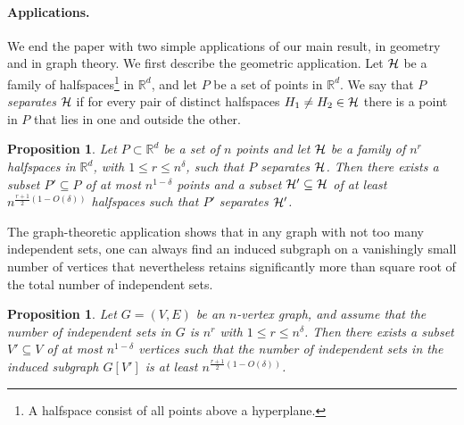 \documentclass[11pt]{article}
\newtheorem{prop}[theo]{Proposition}
\newcommand{\R}{{\mathbb R}}
\renewcommand{\d}{\delta}
\newcommand{\HH}{{\cal H}}
\begin{document}
\paragraph{Applications.}
We end the paper with two simple 
applications of our main result, in geometry and in graph theory. 
We first describe the geometric application.
Let $\HH$ be a family of halfspaces\footnote{A halfspace consist of all points above a hyperplane.}  in $\R^d$, and let $P$ be a set of points in $\R^d$. We say that $P$ \emph{separates} $\HH$ if for every pair of distinct halfspaces $H_1 \neq H_2 \in \HH$ there is a point in $P$
that lies in one and outside the other.

\begin{prop}\label{prop:application-intro}
	Let $P \subset \R^d$ be a set of $n$ points and let $\HH$ be a family of $n^r$ halfspaces in $\R^d$, with $1 \le r \le n^\d$, such that $P$ separates $\HH$.  
	Then there exists a subset $P' \subseteq P$ of at most $n^{1-\d}$ points and
	a subset $\HH' \subseteq \HH$ of at least $n^{\frac{r+1}{2}(1-O(\d))}$ halfspaces such that $P'$ separates $\HH'$.
%	
\end{prop}

The graph-theoretic application shows that in any graph with not too many independent sets, one can always find an induced subgraph on a vanishingly small number of vertices that nevertheless retains significantly more than square root of the total number of independent sets.

\begin{prop}%
	Let $G = (V,E)$ be an $n$-vertex graph, and assume that the number of independent sets in $G$ is $n^r$ with $1 \le r \le n^\d$.
	Then there exists a subset $V' \subseteq V$ of at most $n^{1-\d}$ vertices such that the number of independent sets in the induced subgraph $G[V']$ is at least $n^{\frac{r+1}{2}(1-O(\d))}$.
\end{prop}
\end{document}
